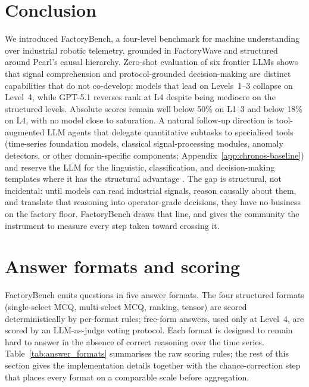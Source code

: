 \documentclass{article}
\begin{document}
\section{Conclusion}

We introduced FactoryBench, a four-level benchmark for machine understanding over industrial robotic telemetry, grounded in FactoryWave and structured around Pearl's causal hierarchy. Zero-shot evaluation of six frontier LLMs shows that signal comprehension and protocol-grounded decision-making are distinct capabilities that do not co-develop: models that lead on Levels~1--3 collapse on Level~4, while GPT-5.1 reverses rank at L4 despite being mediocre on the structured levels. Absolute scores remain well below 50\% on L1--3 and below 18\% on L4, with no model close to saturation. A natural follow-up direction is tool-augmented LLM agents that delegate quantitative subtasks to specialised tools (time-series foundation models, classical signal-processing modules, anomaly detectors, or other domain-specific components; Appendix~\ref{app:chronos-baseline}) and reserve the LLM for the linguistic, classification, and decision-making templates where it has the structural advantage \cite{schick2023toolformer,yao2023react,qin2023tool}. The gap is structural, not incidental: until models can read industrial signals, reason causally about them, and translate that reasoning into operator-grade decisions, they have no business on the factory floor. FactoryBench draws that line, and gives the community the instrument to measure every step taken toward crossing it.

\newpage


%

\newpage
\appendix

\section{Answer formats and scoring}
\label{app:answer-formats}

FactoryBench emits questions in five answer formats. The four structured formats (single-select MCQ, multi-select MCQ, ranking, tensor) are scored deterministically by per-format rules; free-form answers, used only at Level~4, are scored by an LLM-as-judge voting protocol. Each format is designed to remain hard to answer in the absence of correct reasoning over the time series. Table~\ref{tab:answer_formats} summarises the raw scoring rules; the rest of this section gives the implementation details together with the chance-correction step that places every format on a comparable scale before aggregation.
\end{document}

